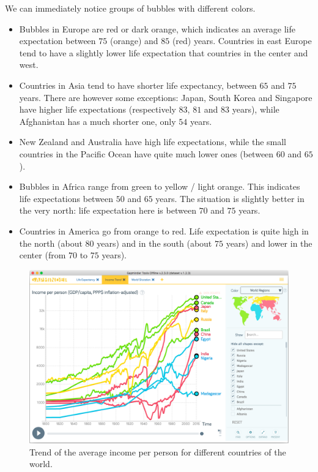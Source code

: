 We can immediately notice groups of bubbles with different colors.
\begin{itemize}
	\item Bubbles in Europe are red or dark orange, which indicates an average life expectation between $75$ (orange) and $85$ (red) years.	Countries in east Europe tend to have a slightly lower life expectation that countries in the center and west.
	\item Countries in Asia tend to have shorter life expectancy, between $65$ and $75$ years. There are however some exceptions: Japan, South Korea and Singapore have higher life expectations (respectively $83$, $81$ and $83$ years), while Afghanistan has a much shorter one, only $54$ years.
	\item New Zealand and Australia have high life expectations, while the small countries in the Pacific Ocean have quite much lower ones (between $60$ and $65$).
	\item Bubbles in Africa range from green to yellow / light orange. This indicates life expectations between $50$ and $65$ years. The situation is slightly better in the very north: life expectation here is between $70$ and $75$ years.
	\item Countries in America go from orange to red. Life expectation is quite high in the north (about $80$ years) and in the south (about $75$ years) and lower in the center (from $70$ to $75$ years).
\end{itemize}


\begin{figure}[H]
	\centering
	\includegraphics[width=0.95\columnwidth]{figures/income-trend}
	\caption{Trend of the average income per person for different countries of the world.}
	\label{fig:income-trend}
\end{figure}


